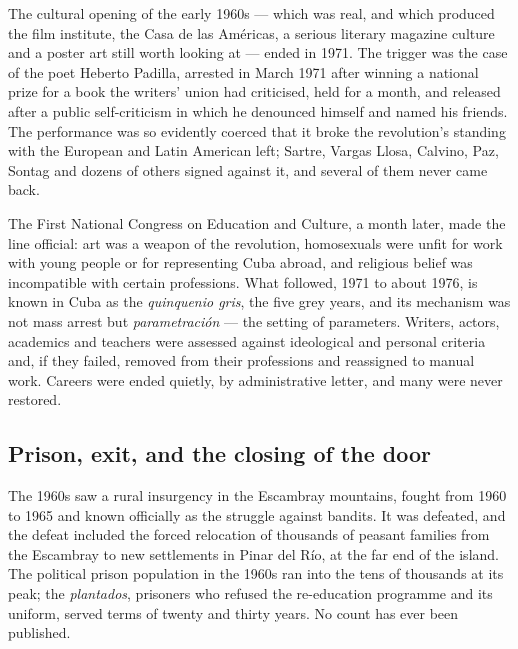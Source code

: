 The cultural opening of the early 1960s --- which was real, and which produced
the film institute, the Casa de las Am\'ericas, a serious literary magazine
culture and a poster art still worth looking at --- ended in 1971. The trigger
was the case of the poet Heberto Padilla, arrested in March 1971 after winning
a national prize for a book the writers' union had criticised, held for a
month, and released after a public self-criticism in which he denounced himself
and named his friends. The performance was so evidently coerced that it broke
the revolution's standing with the European and Latin American left; Sartre,
Vargas Llosa, Calvino, Paz, Sontag and dozens of others signed against it, and
several of them never came back.

The First National Congress on Education and Culture, a month later, made the
line official: art was a weapon of the revolution, homosexuals were unfit for
work with young people or for representing Cuba abroad, and religious belief
was incompatible with certain professions. What followed, 1971 to about 1976,
is known in Cuba as the \emph{quinquenio gris}, the five grey years, and its
mechanism was not mass arrest but \emph{parametraci\'on} --- the setting of
parameters. Writers, actors, academics and teachers were assessed against
ideological and personal criteria and, if they failed, removed from their
professions and reassigned to manual work. Careers were ended quietly, by
administrative letter, and many were never restored.

\subsection{Prison, exit, and the closing of the door}

The 1960s saw a rural insurgency in the Escambray mountains, fought from 1960
to 1965 and known officially as the struggle against bandits. It was defeated,
and the defeat included the forced relocation of thousands of peasant families
from the Escambray to new settlements in Pinar del R\'io, at the far end of the
island. The political prison population in the 1960s ran into the tens of
thousands at its peak; the \emph{plantados}, prisoners who refused the
re-education programme and its uniform, served terms of twenty and thirty
years.\unv{} No count has ever been published.

